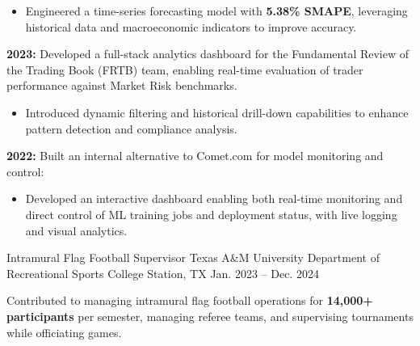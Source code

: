 \begin{cventries}
{\begin{cvitems}
{\begin{itemize}
            \item Engineered a time-series forecasting model with \textbf{5.38\% SMAPE}, leveraging historical data and macroeconomic indicators to improve accuracy.
          \end{itemize}
            }
            \item { \textbf{2023:} Developed a full-stack analytics dashboard for the Fundamental Review of the Trading Book (FRTB) team, enabling real-time evaluation of trader performance against Market Risk benchmarks.
            \begin{itemize}
            \item Introduced dynamic filtering and historical drill-down capabilities to enhance pattern detection and compliance analysis.            
            \end{itemize}
            }
            \item{ \textbf{2022:} Built an internal alternative to Comet.com for model monitoring and control:
            \begin{itemize}
                \item Developed an interactive dashboard enabling both real-time monitoring and direct control of ML training jobs and deployment status, with live logging and visual analytics.
            \end{itemize}
            } 
          \end{cvitems}
        }
\cventry
  {Intramural Flag Football Supervisor} %
  {Texas A\&M University Department of Recreational Sports} %
  {College Station, TX} %
  {Jan. 2023 -- Dec. 2024} %
  {
    \begin{cvitems}
      \item{Contributed to managing intramural flag football operations for \textbf{14,000+ participants} per semester, managing referee teams, and supervising tournaments while officiating games.
}
\end{cvitems}}
\end{cventries}
